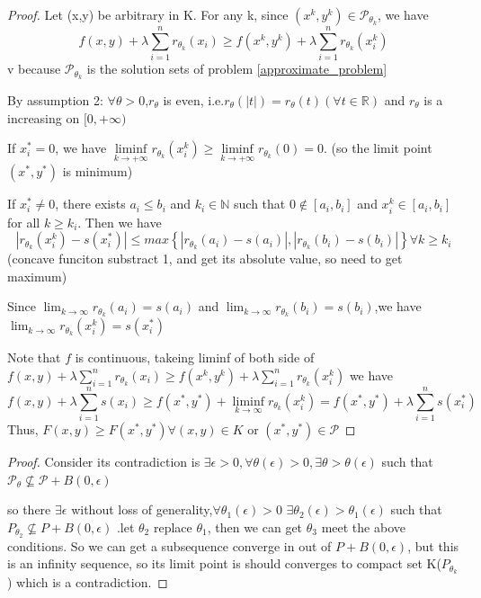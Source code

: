 \documentclass[11pt,en,bibstyle=ieeetr]{elegantpaper}
\begin{document}
\begin{proof}
	Let (x,y) be arbitrary in K. For any k, since $ (x^k,y^k) \in \mathcal{P}_{\theta_k} $,
	we have 
	$$
	f(x,y) + \lambda \sum_{i=1}^{n}r_{\theta_k}(x_i) \geq f(x^k,y^k)+\lambda \sum_{i=1}^{n}r_{\theta_k}(x_i^k) 
	$$v
because $ \mathcal{P}_{{\theta}_k} $ is the solution sets of problem \ref{approximate_problem}

By assumption 2:
 $\forall \theta>0$,$r_\theta$ is even, i.e.$r_\theta (\left| t \right| ) = r_\theta(t)(\forall t \in \mathbb{R})$ and $r_\theta$ is a increasing on $[0,+\infty)$
 
 If $ x_i^* = 0$, we have $ \liminf\limits _{k \to + \infty} r_{\theta_k}(x_i^k) \geq \liminf\limits_{k\to +\infty}{r_{\theta_k}}(0) = 0$. (so the limit point $ (x^*,y^*) $ is minimum)
 
 If $ x_i^* \neq 0 $, there exists $ a_i \leq b_i $ and $ k_i \in \mathbb{N} $ such that $ 0 \notin [a_i,b_i] $ and $ x_i^k \in [a_i,b_i] $ for all $ k \geq k_i $. 
 Then we have 
$$ 
\left| r_{\theta_k}(x_i^k) - s(x_i^*) \right| \leq max \left\{\left| r_{\theta_k}(a_i)-s(a_i) \right|,\left| r_{\theta_k}(b_i)-s(b_i) \right|    \right\}  \forall k \geq k_i
$$
(concave funciton substract 1, and get its absolute value, so need to get maximum)

Since $ \lim_{k \to \infty} r_{\theta_k}(a_i) = s(a_i)$ and $ \lim_{k \to \infty} r_{\theta_k}(b_i) = s(b_i)  $,we have $ \lim_{k \to \infty}r_{\theta_k}(x_i^k)  = s(x_i^*) $

Note that $ f $ is continuous, takeing liminf of both side of $f(x,y) + \lambda \sum_{i=1}^{n}r_{\theta_k}(x_i) \geq f(x^k,y^k)+\lambda \sum_{i=1}^{n}r_{\theta_k}(x_i^k) 
 $ 
we have 
$$ 
f(x,y)+\lambda \sum_{i=1}^{n}s(x_i) \geq f(x^*,y^*) + \liminf\limits_{k \to \infty}r_{\theta_k}(x_i^k) = f(x^*,y^*) + \lambda \sum_{i=1}^{n}s(x_i^*)
$$
Thus, $ F(x,y) \geq F(x^*,y^*) \forall (x,y) \in K$ or $ (x^*,y^*) \in \mathcal{P} $
\end{proof}

\begin{proof}
	Consider its contradiction is $ \exists \epsilon >0, \forall \theta(\epsilon)>0, \exists \theta > \theta(\epsilon)$ such that $\mathcal{P}_\theta \nsubseteq \mathcal{P}+B(0,\epsilon ) $	

	so there $ \exists \epsilon$  without loss of generality,$ \forall \theta_1(\epsilon )>0$
$ \exists \theta _2(\epsilon) > \theta_1(\epsilon) $ such that $ P_{\theta_2} \nsubseteq P+B(0,\epsilon) $
.let $ \theta_2 $ replace $ \theta_1 $, then we can get $ \theta_3 $ meet the above conditions. So we can get a subsequence converge in out of $ P+B(0,\epsilon) $,
but this is an infinity sequence, so its limit point is should converges to compact set K($ P_{\theta_k} $) which is a contradiction.
\end{proof}
\end{document}
